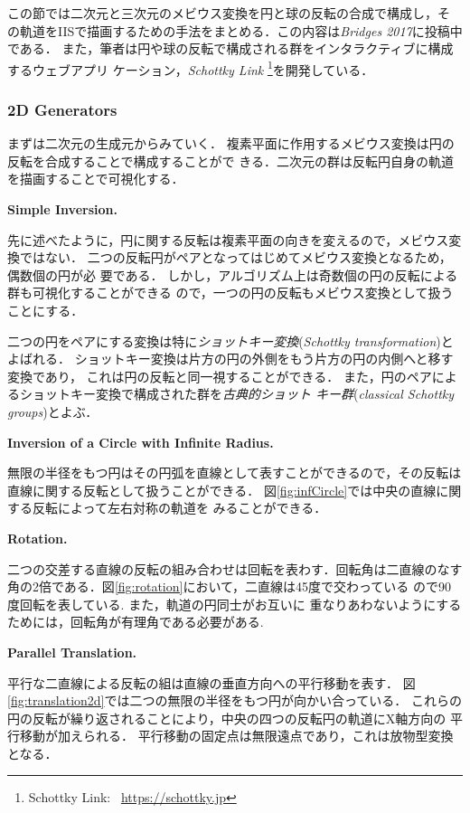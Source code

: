 この節では二次元と三次元のメビウス変換を円と球の反転の合成で構成し，そ
の軌道をIISで描画するための手法をまとめる．この内容は\textit{Bridges
2017}に投稿中である．
また，筆者は円や球の反転で構成される群をインタラクティブに構成するウェブアプリ
ケーション，{\it Schottky Link} \footnote{Schottky Link:~
\url{https://schottky.jp}}を開発している．

\subsubsection{2D Generators}

まずは二次元の生成元からみていく．
複素平面に作用するメビウス変換は円の反転を合成することで構成することがで
きる．二次元の群は反転円自身の軌道を描画することで可視化する．

\noindent\textbf{Simple Inversion.}

先に述べたように，円に関する反転は複素平面の向きを変えるので，メビウス変
換ではない．
二つの反転円がペアとなってはじめてメビウス変換となるため，偶数個の円が必
要である．
しかし，アルゴリズム上は奇数個の円の反転による群も可視化することができる
ので，一つの円の反転もメビウス変換として扱うことにする．

二つの円をペアにする変換は特に\emph{ショットキー変換}(\textit{Schottky
transformation})とよばれる．
ショットキー変換は片方の円の外側をもう片方の円の内側へと移す変換であり，
これは円の反転と同一視することができる．
また，円のペアによるショットキー変換で構成された群を\emph{古典的ショット
キー群}(\textit{classical Schottky groups})とよぶ．

\noindent\textbf{Inversion of a Circle with Infinite Radius.}

無限の半径をもつ円はその円弧を直線として表すことができるので，その反転は
直線に関する反転として扱うことができる．
図\ref{fig:infCircle}では中央の直線に関する反転によって左右対称の軌道を
みることができる．

\noindent\textbf{Rotation.}

二つの交差する直線の反転の組み合わせは回転を表わす．回転角は二直線のなす
角の2倍である．図\ref{fig:rotation}において，二直線は45度で交わっている
ので90度回転を表している. また，軌道の円同士がお互いに
重なりあわないようにするためには，回転角が有理角である必要がある.

\noindent\textbf{Parallel Translation.}

平行な二直線による反転の組は直線の垂直方向への平行移動を表す．
図\ref{fig:translation2d}では二つの無限の半径をもつ円が向かい合っている．
これらの円の反転が繰り返されることにより，中央の四つの反転円の軌道にX軸方向の
平行移動が加えられる．
平行移動の固定点は無限遠点であり，これは放物型変換となる．

